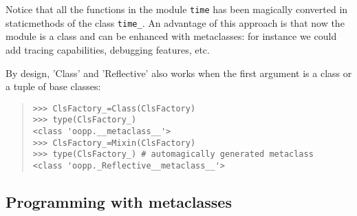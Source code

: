 \documentclass[10pt,english]{article}
\begin{document}
Notice that all the functions in the module \texttt{time} has been magically 
converted in staticmethods of the class \texttt{time{\_}}. An advantage of this 
approach is that now the module is a class and can be enhanced with 
metaclasses: for instance we could add tracing capabilities, debugging 
features, etc.

By design, 'Class' and 'Reflective' also works when the first argument 
is a class or a tuple of base classes:
\begin{quote}
\begin{verbatim}>>> ClsFactory_=Class(ClsFactory)
>>> type(ClsFactory_)
<class 'oopp.__metaclass__'>
>>> ClsFactory_=Mixin(ClsFactory) 
>>> type(ClsFactory_) # automagically generated metaclass
<class 'oopp._Reflective__metaclass__'>\end{verbatim}
\end{quote}



\hypertarget{programming-with-metaclasses}{}
\subsection*{Programming with metaclasses}
\end{document}
